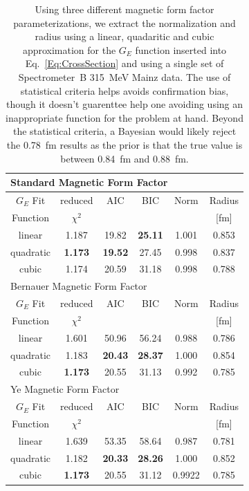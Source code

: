 \documentclass[10pt,aps,prc,twocolumn]{revtex4-1}
\begin{document}
\begin{table}
\caption{Using three different magnetic form factor parameterizations, we extract the normalization
and radius using a linear, quadaritic and cubic approximation for the $G_E$ function inserted into
Eq.~\ref{Eq:CrossSection} and using a single set of Spectrometer~B 315~MeV Mainz data.
The use of statistical criteria helps avoids confirmation bias, though it doesn't guarenttee help
one avoiding using an inappropriate function for the problem at hand.  Beyond the statistical criteria,
a Bayesian would likely reject the 0.78~fm results as the prior is that the true value 
is between 0.84~fm and 0.88~fm.}
\begin{tabular}{c|ccccc} \hline  \hline
\multicolumn{6}{l}{Standard Magnetic Form Factor}      \\  \hline
$G_E$ Fit       & reduced  & AIC  & BIC  & Norm   & Radius    \\  
Function  & $\chi^2$ &      &      &                 & [fm]      \\  \hline
linear    & 1.187    & 19.82 & {\bf{25.11}} & 1.001         & 0.853     \\
quadratic & {\bf{1.173}} & {\bf{19.52}} & 27.45 & 0.998         & 0.837     \\
cubic     & 1.174    & 20.59 & 31.18 & 0.998         & 0.788     \\    \hline \hline
\multicolumn{6}{l}{Bernauer Magnetic Form Factor}      \\  \hline
$G_E$ Fit       & reduced  & AIC   & BIC   & Norm & Radius    \\  
Function  & $\chi^2$ &       &       &               & [fm]      \\  \hline
linear    & 1.601    & 50.96 & 56.24 & 0.988       & 0.786     \\
quadratic & 1.183    & {\bf{20.43}} & {\bf{28.37}} & 1.000        & 0.854     \\ 
cubic     & {\bf{1.173}}    & 20.55 & 31.13 & 0.992        & 0.785     \\ \hline \hline
\multicolumn{6}{l}{Ye Magnetic Form Factor}      \\  \hline
$G_E$ Fit       & reduced  & AIC   & BIC   & Norm & Radius    \\  
Function  & $\chi^2$ &       &       &               & [fm]      \\  \hline
linear    & 1.639  & 53.35  & 58.64 & 0.987        & 0.781     \\
quadratic & 1.182  & {\bf{20.33}}  & {\bf{28.26}} & 1.000        & 0.852     \\
cubic     & {\bf{1.173}}  & 20.55  & 31.12 & 0.9922        & 0.785    \\ \hline \hline
\end{tabular}
\label{datatable}
\end{table}
\end{document}
